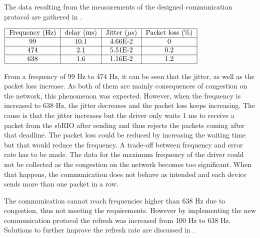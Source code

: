 The data resulting from the measurements of the designed communication protocol are gathered in .

\begin{center}
  $\begin{tabular}{|c|c|c|c|c|}
    \hline
    \text{Frequency (Hz)} & \text{delay (ms)} & \text{Jitter ($\mu$s)} & \text{Packet loss (\%)}\\
    \hline
    99 & 10.1 & 4.66E-2 & 0 \\
    \hline
    474 & 2.1 & 5.51E-2 & 0.2 \\
    \hline
    638 & 1.6 & 1.16E-2 & 1.2 \\
    \hline
  \end{tabular}$
	\label{tab:new_protocol}
\end{center}

From a frequency of 99 Hz to 474 Hz, it can be seen that the jitter, as well as the packet loss increase. As both of them are mainly consequences of congestion on the network\cite{cisco_jitter}, this phenomenon was expected. However, when the frequency is increased to 638 Hz, the jitter decreases and the packet loss keeps increasing. The cause is that the jitter increases but the driver only waits 1 ms to receive a packet from the sbRIO after sending and thus rejects the packets coming after that deadline. The packet loss could be reduced by increasing the waiting time but that would reduce the frequency. A trade-off between frequency and error rate has to be made.
The data for the maximum frequency of the driver could not be collected as the congestion on the network becomes too significant. When that happens, the communication does not behave as intended and each device sends more than one packet in a row.

The communication cannot reach frequencies higher than 638 Hz due to congestion, thus not meeting the requirements. However by implementing the new communication protocol the refresh was increased from 100 Hz to 638 Hz. Solutions to further improve the refresh rate are discussed in .